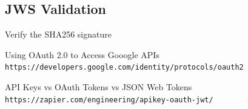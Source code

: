 \documentclass{style}
\begin{document}
\subsection{JWS Validation}
Verify the SHA256 signature

\begin{thebibliography}{9}
    Using OAuth 2.0 to Access Gooogle APIs
    \\\texttt{https://developers.google.com/identity/protocols/oauth2}

    API Keys vs OAuth Tokens vs JSON Web Tokens
    \\\texttt{https://zapier.com/engineering/apikey-oauth-jwt/}
\end{thebibliography}

\newpage
\end{document}
